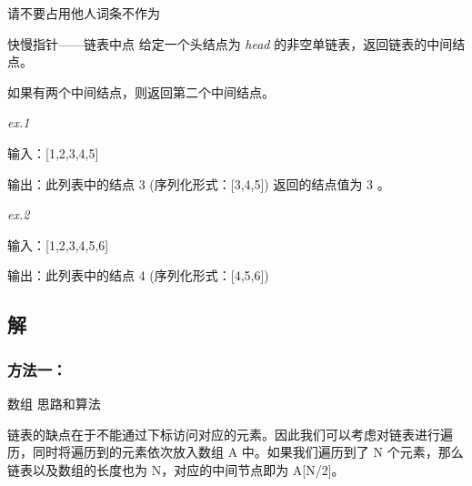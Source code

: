 
\begin{issues}
\issueDraft 请不要占用他人词条不作为
\end{issues}

\begin{example}{快慢指针——链表中点}
给定一个头结点为 \textsl{head} 的非空单链表，返回链表的中间结点。

如果有两个中间结点，则返回第二个中间结点。

\textsl{ex.1}

输入：[1,2,3,4,5] 

输出：此列表中的结点 3 (序列化形式：[3,4,5])
返回的结点值为 3 。

\textsl{ex.2}

输入：[1,2,3,4,5,6]

输出：此列表中的结点 4 (序列化形式：[4,5,6])
\end{example}

\subsection{解}
\subsubsection{方法一：}数组
思路和算法

链表的缺点在于不能通过下标访问对应的元素。因此我们可以考虑对链表进行遍历，同时将遍历到的元素依次放入数组 A 中。如果我们遍历到了 N 个元素，那么链表以及数组的长度也为 N，对应的中间节点即为 A[N/2]。

